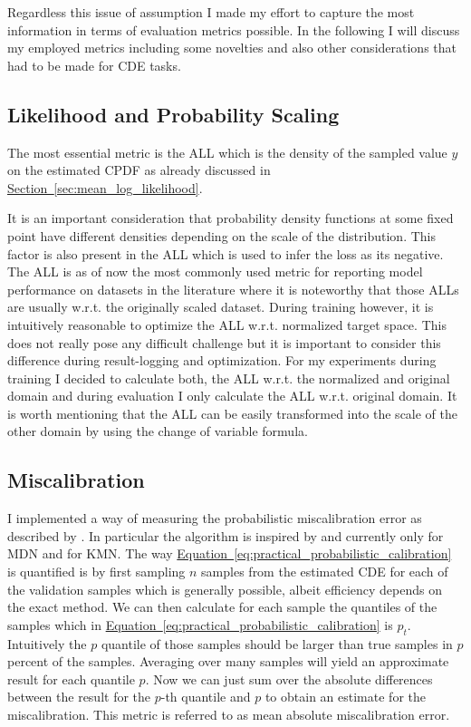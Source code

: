 \documentclass{article}
\newcommand\pef[1]{\hyperref[#1]{Section~\ref{#1}}}
\newcommand\eef[1]{\hyperref[#1]{Equation~\ref{#1}}}
\begin{document}
Regardless this issue of assumption I made my effort to capture the most information in terms of evaluation metrics possible. In the following I will discuss my employed metrics including some novelties and also other considerations that had to be made for CDE tasks.

\subsection{Likelihood and Probability Scaling}
The most essential metric is the ALL which is the density of the sampled value $y$ on the estimated CPDF as already discussed in \pef{sec:mean_log_likelihood}.

It is an important consideration that probability density functions at some fixed point have different densities depending on the scale of the distribution. This factor is also present in the ALL which is used to infer the loss as its negative. The ALL is as of now the most commonly used metric for reporting model performance on datasets in the literature \citep{rothfuss2019conditional, rothfuss2019noise, trippe2018conditional} where it is noteworthy that those ALLs are usually w.r.t. the originally scaled dataset. During training however, it is intuitively reasonable to optimize the ALL w.r.t. normalized target space. This does not really pose any difficult challenge but it is important to consider this difference during result-logging and optimization. For my experiments during training I decided to calculate both, the ALL w.r.t. the normalized and original domain and during evaluation I only calculate the ALL w.r.t. original domain. It is worth mentioning that the ALL can be easily transformed into the scale of the other domain by using the change of variable formula.

\subsection{Miscalibration}\label{sec:miscalibration}
I implemented a way of measuring the probabilistic miscalibration error as described by \citep{gneiting2007probabilistic}. In particular the algorithm is inspired by \citep{klotz2021uncertainty} and \citep{chung2020beyond, tran2020methods} currently only for MDN and for KMN. The way \eef{eq:practical_probabilistic_calibration} is quantified is by first sampling $n$ samples from the estimated CDE for each of the validation samples which is generally possible, albeit efficiency depends on the exact method. We can then calculate for each sample the quantiles of the samples which in \eef{eq:practical_probabilistic_calibration} is $p_t$. Intuitively the $p$ quantile of those samples should be larger than true samples in $p$ percent of the samples. Averaging over many samples will yield an approximate result for each quantile $p$. Now we can just sum over the absolute differences between the result for the $p$-th quantile and $p$ to obtain an estimate for the miscalibration. This metric is referred to as mean absolute miscalibration error.
\end{document}
